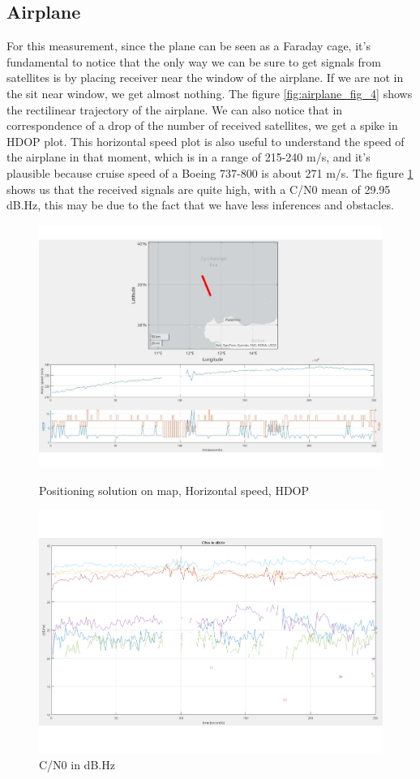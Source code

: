 
\subsection{Airplane}
\label{sec:airplane}
For this measurement, since the plane can be seen as a Faraday cage, it's fundamental to notice that the only way we can be sure to get signals from satellites is by placing receiver near the window of the airplane. If we are not in the sit near window, we get almost nothing. The figure \ref{fig:airplane_fig_4} shows the rectilinear trajectory of the airplane. We can also notice that in correspondence of a drop of the number of received satellites, we get a spike in HDOP plot. This horizontal speed plot is also useful to understand the speed of the airplane in that moment, which is in a range of 215-240 m/s, and it's plausible because cruise speed of a Boeing 737-800 is about 271 m/s. The figure \ref{fig:airplane_fig_3} shows us that the received signals are quite high, with a C/N0 mean of 29.95 dB.Hz, this may be due to the fact that we have less inferences and obstacles.
\begin{figure}[H]
\includegraphics[scale=0.20]{images/airplane_fig_4.pdf}
\caption{Positioning solution on map, Horizontal speed, HDOP}
\label{fig:airplane_fig_4}
\vspace{2pt}
\includegraphics[scale=0.20]{images/airplane_fig_3.pdf}
\caption{C/N0 in dB.Hz}
\label{fig:airplane_fig_3}
\end{figure}
\vspace{0.2cm}